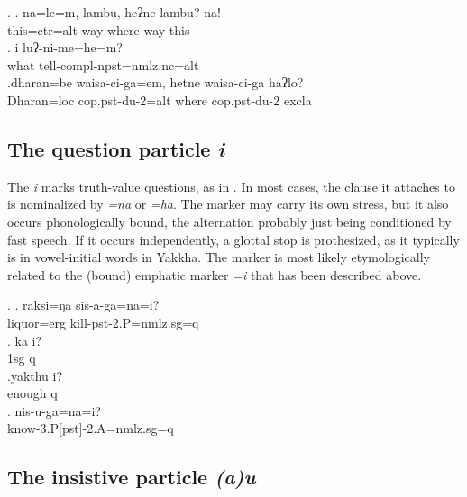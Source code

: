  \ex. \ag. na=le=m,              lambu, heʔne lambu? na!\\
 this{\sc =ctr=alt} way where way this\\
 \bg.  i    luʔ-ni-me=he=m?\\
 what tell{\sc -compl-npst=nmlz.nc=alt}\\
  
 \bg.dharan=be     waisa-ci-ga=em,             hetne  waisa-ci-ga           haʔlo?\\
 Dharan{\sc =loc} {\sc cop.pst-du-2=alt} where  {\sc cop.pst-du-2} {\sc excla}\\
  
 
 
\subsection{The question particle \emph{i}}\label{ptcl-q}

The  \emph{i} marks truth-value questions, as in \Next. In most cases, the clause it attaches to is nominalized by \emph{=na} or \emph{=ha}. The marker may carry its own stress, but it also occurs phonologically bound, the alternation probably just being conditioned by fast speech. If it occurs independently, a glottal stop is prothesized, as it typically is in vowel-initial words in Yakkha. The marker is most likely ety\-mo\-lo\-gi\-cally related to the (bound) emphatic  marker \emph{=i} that has been described above.

	\ex. \ag.  raksi=ŋa  sis-a-ga=na=i? \\
		liquor{\sc =erg} kill{\sc [3sg.A]-pst-2.P=nmlz.sg=q}\\
		\bg. ka i? \\
		{\sc 1sg} {\sc q}\\
		\rede{I?}
		\bg.yakthu i?\\
		enough {\sc q}\\
		 \source{36\_cvs\_06.248 }
\bg. nis-u-ga=na=i?\\
	know{\sc -3.P[pst]-2.A=nmlz.sg=q}\\
 
 
 
\subsection{The insistive particle \emph{(a)u}}  

